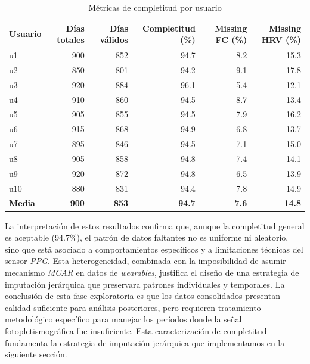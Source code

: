 \begin{table}[H]
    \centering
    \caption{Métricas de completitud por usuario}
    \label{tab:data_quality_raw}
    \small
    \begin{tabular}{@{}lrrrrr@{}}
        \toprule
        \textbf{Usuario} & \textbf{Días totales} & \textbf{Días válidos} & \textbf{Completitud (\%)} & \textbf{Missing FC (\%)} & \textbf{Missing HRV (\%)} \\
        \midrule
        u1 & 900 & 852 & 94.7 & 8.2 & 15.3 \\
        u2 & 850 & 801 & 94.2 & 9.1 & 17.8 \\
        u3 & 920 & 884 & 96.1 & 5.4 & 12.1 \\
        u4 & 910 & 860 & 94.5 & 8.7 & 13.4 \\
        u5 & 905 & 855 & 94.5 & 7.9 & 16.2 \\
        u6 & 915 & 868 & 94.9 & 6.8 & 13.7 \\
        u7 & 895 & 846 & 94.5 & 7.1 & 15.0 \\
        u8 & 905 & 858 & 94.8 & 7.4 & 14.1 \\
        u9 & 920 & 872 & 94.8 & 6.5 & 13.9 \\
        u10 & 880 & 831 & 94.4 & 7.8 & 14.9 \\
        \midrule
        \textbf{Media} & \textbf{900} & \textbf{853} & \textbf{94.7} & \textbf{7.6} & \textbf{14.8} \\
        \bottomrule
    \end{tabular}
\end{table}

La interpretación de estos resultados confirma que, aunque la completitud general es aceptable (94.7\%), el patrón de datos faltantes no es uniforme ni aleatorio, sino que está asociado a comportamientos específicos y a limitaciones técnicas del sensor \textit{PPG}. Esta heterogeneidad, combinada con la imposibilidad de asumir mecanismo \textit{MCAR} en datos de \textit{wearables}, justifica el diseño de una estrategia de imputación jerárquica que preservara patrones individuales y temporales. La conclusión de esta fase exploratoria es que los datos consolidados presentan calidad suficiente para análisis posteriores, pero requieren tratamiento metodológico específico para manejar los períodos donde la señal fotopletismográfica fue insuficiente. Esta caracterización de completitud fundamenta la estrategia de imputación jerárquica que implementamos en la siguiente sección.

\FloatBarrier

